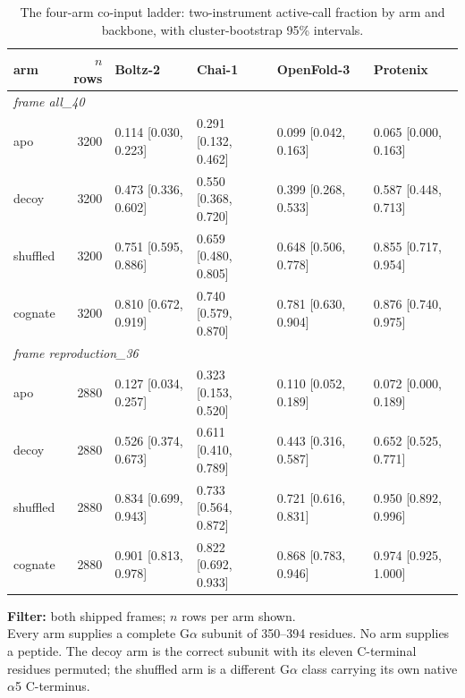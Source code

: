 \begin{table}[htbp]
\centering
\footnotesize
\caption{The four-arm co-input ladder: two-instrument active-call fraction by arm and backbone, with cluster-bootstrap 95\% intervals.}
\label{stab:ladder}
\begin{tabular}{lrllll}
\toprule
arm & $n$ rows & Boltz-2 & Chai-1 & OpenFold-3 & Protenix \\
\midrule
\multicolumn{6}{l}{\textit{frame all\_40}} \\
\quad apo & 3200 & 0.114 [0.030, 0.223] & 0.291 [0.132, 0.462] & 0.099 [0.042, 0.163] & 0.065 [0.000, 0.163] \\
\quad decoy & 3200 & 0.473 [0.336, 0.602] & 0.550 [0.368, 0.720] & 0.399 [0.268, 0.533] & 0.587 [0.448, 0.713] \\
\quad shuffled & 3200 & 0.751 [0.595, 0.886] & 0.659 [0.480, 0.805] & 0.648 [0.506, 0.778] & 0.855 [0.717, 0.954] \\
\quad cognate & 3200 & 0.810 [0.672, 0.919] & 0.740 [0.579, 0.870] & 0.781 [0.630, 0.904] & 0.876 [0.740, 0.975] \\
\multicolumn{6}{l}{\textit{frame reproduction\_36}} \\
\quad apo & 2880 & 0.127 [0.034, 0.257] & 0.323 [0.153, 0.520] & 0.110 [0.052, 0.189] & 0.072 [0.000, 0.189] \\
\quad decoy & 2880 & 0.526 [0.374, 0.673] & 0.611 [0.410, 0.789] & 0.443 [0.316, 0.587] & 0.652 [0.525, 0.771] \\
\quad shuffled & 2880 & 0.834 [0.699, 0.943] & 0.733 [0.564, 0.872] & 0.721 [0.616, 0.831] & 0.950 [0.892, 0.996] \\
\quad cognate & 2880 & 0.901 [0.813, 0.978] & 0.822 [0.692, 0.933] & 0.868 [0.783, 0.946] & 0.974 [0.925, 1.000] \\
\bottomrule
\end{tabular}
\begin{flushleft}\scriptsize
\textbf{Filter:} both shipped frames; $n$ rows per arm shown. \\ Every arm supplies a complete G$\alpha$ subunit of 350--394 residues. No arm supplies a peptide. The decoy arm is the correct subunit with its eleven C-terminal residues permuted; the shuffled arm is a different G$\alpha$ class carrying its own native $\alpha$5 C-terminus.
\end{flushleft}
\end{table}
